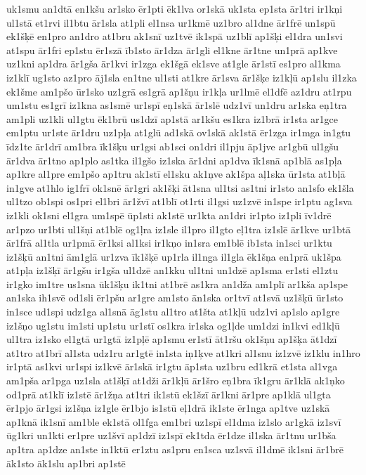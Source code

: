 {uk1smu
an1dtā
en1kšu
ar1sko
ēr1pti
ēk1lva
or1skā
uk1sta
ep1sta
ār1tri
ir1kņi
ul1stā
et1rvi
il1btu
ār1sla
at1pli
el1nsa
ur1kmē
uz1bro
al1dne
ār1frē
un1spū
ek1šķē
en1pro
an1dro
at1bru
ak1snī
uz1tvē
ik1spā
uz1blī
ap1šķi
el1dra
un1svi
at1spu
ār1fri
ep1stu
ēr1szā
īb1sto
ār1dza
ār1gli
el1kne
ār1tne
un1prā
ap1kve
uz1kni
ap1dra
ār1gša
ār1kvi
ir1zga
ek1šgā
ek1sve
at1gle
ār1stī
es1pro
al1kma
iz1klī
ug1sto
az1pro
āj1sla
en1tne
ul1sti
at1kre
ār1sva
ār1šķe
iz1kļū
ap1slu
il1zka
ek1šme
am1pšo
ūr1sko
uz1grā
es1grā
ap1šņu
ir1kļa
ur1lmē
el1dfē
az1dru
at1rpu
um1stu
es1grī
iz1kna
as1smē
ur1spī
eņ1skā
ār1slē
udz1vī
un1dru
ar1ska
eņ1tra
am1pli
uz1kli
ul1gtu
ēk1brū
us1dzī
ap1stā
ar1kšu
es1kra
iz1brā
ir1sta
ar1gce
em1ptu
ur1ste
ār1dru
uz1pļa
at1glū
ad1skā
ov1skā
ak1stā
ēr1zga
ir1mga
in1gtu
īdz1te
ār1drī
am1bra
īk1šķu
ur1gsi
ab1sci
on1dri
il1pju
āp1jve
ar1gbū
ul1gšu
ār1dva
ār1tno
ap1plo
as1tka
il1gšo
iz1ska
ār1dni
ap1dva
īk1snā
ap1blā
as1pļa
ap1kre
al1pre
em1pšo
ap1tru
ak1stī
el1sku
ak1ņve
ak1špa
aļ1ska
ūr1sta
at1bļā
in1gve
at1hlo
ig1frī
ok1snē
ār1gri
ak1šķi
āt1sna
ul1tsi
as1tni
ir1sto
an1sfo
ek1šla
ul1tzo
ob1spi
os1pri
el1bri
ār1žvī
at1blī
ot1rti
il1gsi
uz1zvē
in1spe
ir1ptu
ag1sva
iz1kli
ok1sni
el1gra
um1spē
ūp1sti
ak1stē
ur1kta
an1dri
ir1pto
iz1pli
īv1drē
ar1pzo
ur1bti
ul1šņi
at1blē
og1ļra
iz1sle
il1pro
il1gto
eļ1tra
iz1slē
ār1kve
ur1btā
ār1frā
al1tla
ur1pmā
ēr1ksi
al1ksi
ir1kņo
in1sra
em1blē
ib1sta
in1sci
ur1ktu
iz1šķū
an1tni
ām1glā
ur1zva
īk1šķē
up1rla
il1nga
il1gla
ēk1šņa
en1prā
uk1špa
at1pļa
iz1šķī
ār1gšu
ir1gša
ul1dzē
an1kku
ul1tni
un1dzē
ap1sma
er1sti
el1ztu
ir1gko
im1tre
us1sna
ūk1šķu
ik1tni
at1brē
as1kra
an1dža
am1plī
ar1kša
ap1spe
an1ska
ih1svē
od1sli
ēr1pšu
ar1gre
am1sto
ān1ska
or1tvī
at1svā
uz1šķū
ūr1sto
in1sce
ud1spi
udz1ga
al1snā
āg1stu
al1tro
at1šta
at1kļū
udz1vi
ap1slo
ap1gre
iz1šņo
ug1stu
im1sti
up1stu
ur1stī
os1kra
ir1ska
og1ļde
um1dzi
in1kvi
ed1kļū
ul1tra
iz1sko
el1gtā
ur1gtā
iz1pļē
ap1smu
er1stī
āt1ršu
ok1šņu
ap1šķa
āt1dzī
at1tro
at1brī
al1sta
udz1ru
ar1gtē
in1sta
iņ1ķve
at1kri
al1snu
iz1zvē
iz1klu
in1hro
ir1ptā
as1kvi
ur1spi
iz1kvē
ār1skā
ir1gtu
āp1sta
uz1bru
ed1krā
et1sta
al1vga
am1pša
ar1pga
uz1sla
at1šķī
at1dži
ār1kļū
ār1šro
eņ1bra
īk1gru
ār1klā
ak1ņko
od1prā
at1klī
iz1stē
ār1žņa
at1tri
ik1stū
ek1šzī
ār1kni
ār1pre
ap1klā
ul1gta
ēr1pjo
ār1gsi
iz1šņa
iz1gle
ēr1bjo
is1stū
eļ1drā
ik1ste
ēr1nga
ap1tve
uz1skā
ap1knā
ik1snī
am1ble
ek1stā
ol1fga
em1bri
uz1spī
el1dma
iz1slo
ar1gkā
iz1svī
ūg1kri
un1kti
er1pre
uz1švī
ap1dzī
iz1spī
ek1tda
ēr1dze
il1ska
ār1tnu
ur1bša
ap1tra
ap1dze
an1ste
in1ktū
er1ztu
as1pru
en1sca
uz1svā
il1dmē
ik1sni
ār1brē
āk1sto
āk1slu
ap1bri
ap1stē
}
